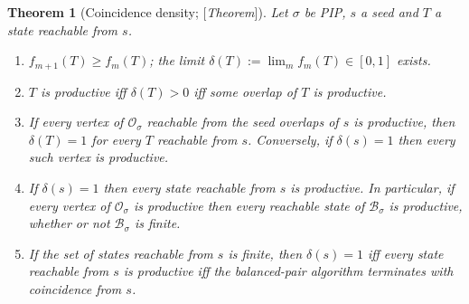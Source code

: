 \documentclass[11pt]{amsart}
\theoremstyle{plain}
\newtheorem{theorem}{Theorem}[section]
\theoremstyle{definition}
\theoremstyle{remark}
\newcommand{\B}{\mathcal{B}}
\newcommand{\Status}[1]{\textup{[\textit{#1}]}}
\begin{document}
\begin{theorem}[Coincidence density; \Status{Theorem}]\label{thm:density}
Let $\sigma$ be PIP, $s$ a seed and $T$ a state reachable from $s$.
\begin{enumerate}[label=\textup{(\roman*)},leftmargin=*]
\item $f_{m+1}(T)\ge f_m(T)$; the limit $\delta(T):=\lim_mf_m(T)\in[0,1]$ exists.
\item $T$ is productive iff $\delta(T)>0$ iff some overlap of $T$ is productive.
\item If every vertex of $\mathcal O_\sigma$ reachable from the seed overlaps of $s$ is productive, then $\delta(T)=1$ for every $T$ reachable from $s$. Conversely, if $\delta(s)=1$ then every such vertex is productive.
\item If $\delta(s)=1$ then every state reachable from $s$ is productive. In particular, if every vertex of $\mathcal O_\sigma$ is productive then every reachable state of $\B_\sigma$ is productive, whether or not $\B_\sigma$ is finite.
\item If the set of states reachable from $s$ is finite, then $\delta(s)=1$ iff every state reachable from $s$ is productive iff the balanced-pair algorithm terminates with coincidence from $s$.
\end{enumerate}
\end{theorem}
\end{document}
